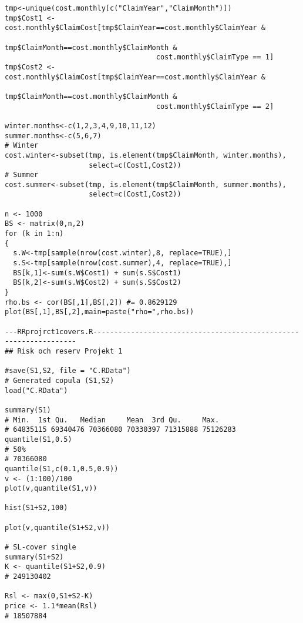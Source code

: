 \documentclass[11pt]{article}
\begin{document}
\begin{verbatim}
tmp<-unique(cost.monthly[c("ClaimYear","ClaimMonth")])
tmp$Cost1 <- cost.monthly$ClaimCost[tmp$ClaimYear==cost.monthly$ClaimYear &
                                    tmp$ClaimMonth==cost.monthly$ClaimMonth &
                                    cost.monthly$ClaimType == 1]
tmp$Cost2 <- cost.monthly$ClaimCost[tmp$ClaimYear==cost.monthly$ClaimYear &
                                    tmp$ClaimMonth==cost.monthly$ClaimMonth &
                                    cost.monthly$ClaimType == 2]

winter.months<-c(1,2,3,4,9,10,11,12)
summer.months<-c(5,6,7)
# Winter
cost.winter<-subset(tmp, is.element(tmp$ClaimMonth, winter.months), 
                    select=c(Cost1,Cost2))
# Summer
cost.summer<-subset(tmp, is.element(tmp$ClaimMonth, summer.months), 
                    select=c(Cost1,Cost2))

n <- 1000
BS <- matrix(0,n,2)
for (k in 1:n)
{
  s.W<-tmp[sample(nrow(cost.winter),8, replace=TRUE),]
  s.S<-tmp[sample(nrow(cost.summer),4, replace=TRUE),]
  BS[k,1]<-sum(s.W$Cost1) + sum(s.S$Cost1)
  BS[k,2]<-sum(s.W$Cost2) + sum(s.S$Cost2)
}
rho.bs <- cor(BS[,1],BS[,2]) #= 0.8629129
plot(BS[,1],BS[,2],main=paste("rho=",rho.bs))

---RRprojrct1covers.R------------------------------------------------------------------
## Risk och reserv Projekt 1

#save(S1,S2, file = "C.RData")
# Generated copula (S1,S2)
load("C.RData")

summary(S1)
# Min.  1st Qu.   Median     Mean  3rd Qu.     Max. 
# 64835115 69340476 70366080 70330397 71315888 75126283 
quantile(S1,0.5)
# 50% 
# 70366080
quantile(S1,c(0.1,0.5,0.9))
v <- (1:100)/100
plot(v,quantile(S1,v))

hist(S1+S2,100)

plot(v,quantile(S1+S2,v))

# SL-cover single
summary(S1+S2)
K <- quantile(S1+S2,0.9)
# 249130402

Rsl <- max(0,S1+S2-K)
price <- 1.1*mean(Rsl)
# 18507884


\end{verbatim}
\end{document}
